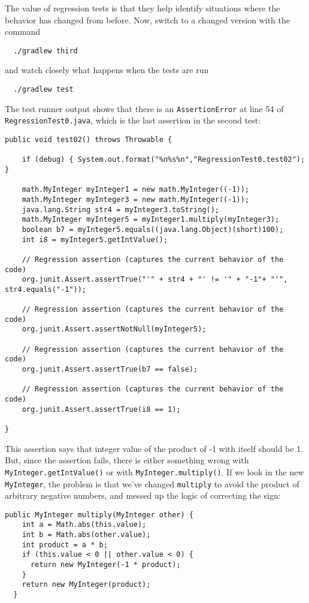 \documentclass[11pt, oneside]{article} %
\newcommand{\code}[1]{{\texttt{#1}}}
\begin{document}
The value of regression tests is that they help identify situations where the behavior has changed from before. 
Now, switch to a changed version with the command
\begin{verbatim}
  ./gradlew third 
\end{verbatim}
and watch closely what happens when the tests are run
\begin{verbatim}
  ./gradlew test 
\end{verbatim}
The test runner output shows that there is an \code{AssertionError} at line 54 of \code{RegressionTest0.java}, which is the last assertion in the second test:
\begin{verbatim}
public void test02() throws Throwable {

    if (debug) { System.out.format("%n%s%n","RegressionTest0.test02"); }

    math.MyInteger myInteger1 = new math.MyInteger((-1));
    math.MyInteger myInteger3 = new math.MyInteger((-1));
    java.lang.String str4 = myInteger3.toString();
    math.MyInteger myInteger5 = myInteger1.multiply(myInteger3);
    boolean b7 = myInteger5.equals((java.lang.Object)(short)100);
    int i8 = myInteger5.getIntValue();
    
    // Regression assertion (captures the current behavior of the code)
    org.junit.Assert.assertTrue("'" + str4 + "' != '" + "-1"+ "'", str4.equals("-1"));
    
    // Regression assertion (captures the current behavior of the code)
    org.junit.Assert.assertNotNull(myInteger5);
    
    // Regression assertion (captures the current behavior of the code)
    org.junit.Assert.assertTrue(b7 == false);
    
    // Regression assertion (captures the current behavior of the code)
    org.junit.Assert.assertTrue(i8 == 1);

}
\end{verbatim}
This assertion says that integer value of the product of -1 with itself  should be 1.
But, since the assertion fails, there is either something wrong with \code{MyInteger.getIntValue()} or with \code{MyInteger.multiply()}.
If we look in the new \code{MyInteger}, the problem is that we've changed \code{multiply} to avoid the product of arbitrary negative numbers, and messed up the logic of correcting the sign:
\begin{verbatim}
public MyInteger multiply(MyInteger other) {
    int a = Math.abs(this.value);
    int b = Math.abs(other.value);
    int product = a * b;
    if (this.value < 0 || other.value < 0) {
      return new MyInteger(-1 * product);
    }
    return new MyInteger(product);
  }
\end{verbatim}
\end{document}
